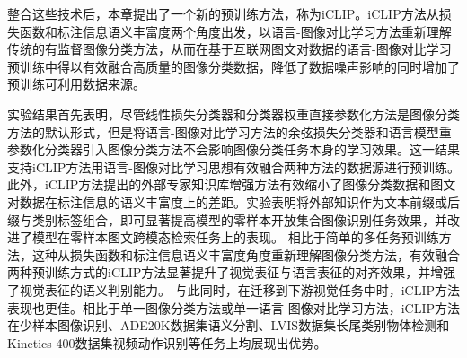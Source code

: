 整合这些技术后，本章提出了一个新的预训练方法，称为iCLIP。iCLIP方法从损失函数和标注信息语义丰富度两个角度出发，以语言-图像对比学习方法重新理解传统的有监督图像分类方法，从而在基于互联网图文对数据的语言-图像对比学习预训练中得以有效融合高质量的图像分类数据，降低了数据噪声影响的同时增加了预训练可利用数据来源。

实验结果首先表明，尽管线性损失分类器和分类器权重直接参数化方法是图像分类方法的默认形式，但是将语言-图像对比学习方法的余弦损失分类器和语言模型重参数化分类器引入图像分类方法不会影响图像分类任务本身的学习效果。这一结果支持iCLIP方法用语言-图像对比学习思想有效融合两种方法的数据源进行预训练。
此外，iCLIP方法提出的外部专家知识库增强方法有效缩小了图像分类数据和图文对数据在标注信息的语义丰富度上的差距。实验表明将外部知识作为文本前缀或后缀与类别标签组合，即可显著提高模型的零样本开放集合图像识别任务效果，并改进了模型在零样本图文跨模态检索任务上的表现。
相比于简单的多任务预训练方法，这种从损失函数和标注信息语义丰富度角度重新理解图像分类方法，有效融合两种预训练方式的iCLIP方法显著提升了视觉表征与语言表征的对齐效果，并增强了视觉表征的语义判别能力。
与此同时，在迁移到下游视觉任务中时，iCLIP方法表现也更佳。相比于单一图像分类方法或单一语言-图像对比学习方法，iCLIP方法在少样本图像识别\cite{imagnettransfer}、ADE20K数据集\cite{zhou2019ade}语义分割、LVIS数据集\cite{gupta2019lvis}长尾类别物体检测和Kinetics-400数据集\cite{kay2017kinetics}视频动作识别等任务上均展现出优势。


